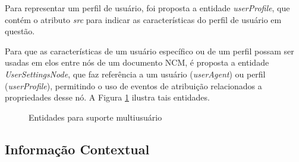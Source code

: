Para representar um perfil de usuário, foi proposta a entidade \textit{userProfile}, que contém o atributo \textit{src} para indicar as características do perfil de usuário em questão. 

Para que as características de um usuário específico ou de um perfil possam ser usadas em elos entre nós de um documento NCM, é proposta a entidade \textit{UserSettingsNode}, que faz referência a um usuário (\textit{userAgent}) ou perfil (\textit{userProfile}), permitindo o uso de eventos de atribuição relacionados a propriedades desse nó. A Figura \ref{fig:exNCM_MultiUsuario} ilustra tais entidades.

\begin{figure}[h!]
    \centering
    \caption{Entidades para suporte multiusuário}
    \label{fig:exNCM_MultiUsuario}
\end{figure}

\subsection{Informação Contextual} \label{sec:InfCont}



